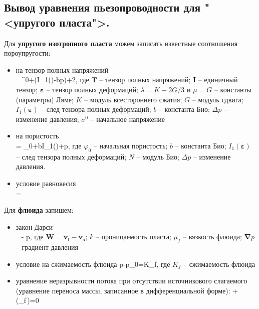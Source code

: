 \documentclass[main.tex]{subfiles}
\begin{document}
\newpage

\subsection{Вывод уравнения пьезопроводности для "<упругого пласта">.}

Для \textbf{упругого изотропного пласта} можем записать известные соотношения пороупругости:
\begin{itemize}[parsep=-5pt]
\item на тензор полных напряжений \\
\beq
{}=\sigma^0+\left(\lambda I_1(\pmb{\varepsilon})-b\Delta p\right)+2\mu\pmb{\varepsilon},
\eeq
где $\pmb{T}$ -- тензор полных напряжений; $\pmb{I}$ -- единичный тензор; $\pmb{\varepsilon}$ -- тензор полных деформаций; $\lambda=K-2G/3$ и $\mu=G$ -- константы (параметры) Ляме; $K$ -- модуль всестороннего сжатия; $G$ -- модуль сдвига; $I_1(\pmb{\varepsilon})$ -- след тензора полных деформаций; $b$ -- константа Био; $\Delta p$ -- изменение давления; $\sigma^0$ -- начальное напряжение
\item на пористость \\
\beq
\varphi = \varphi_0+bI_1(\pmb{\varepsilon})+\Delta p,
\eeq
где $\varphi_0$ -- начальная пористость; $b$ -- константа Био; $I_1(\pmb{\varepsilon})$ -- след тензора полных деформаций; $N$ -- модуль Био; $\Delta p$ -- изменение давления.
\item условие равновесия \\
\beq
\pmb{\nabla}\cdot{}=
\eeq
\end{itemize}

Для \textbf{флюида} запишем:
\begin{itemize}[parsep=-5pt]
	\item закон Дарси \\
	\beq
	=-\cdot\pmb{\nabla} p,
	\eeq
	где $\pmb{W}=\pmb{v_f}-\pmb{v_s}$; $k$ -- проницаемость пласта; $\mu_f$ -- вязкость флюида; $\pmb{\nabla} p$ -- градиент давления
	\item условие на сжимаемость флюида
	\beq
	p-p_0=K_f,
	\eeq
	где $K_f$ -- сжимаемость флюида
	\item уравнение неразрывности потока при отсутствии источникового слагаемого (уравнение переноса массы, записанное в дифференциальной форме):
	\beq
	+\pmb{\nabla}\cdot\left(\rho_f\varphi\,\right)=0
	\eeq
\end{itemize}
\end{document}
